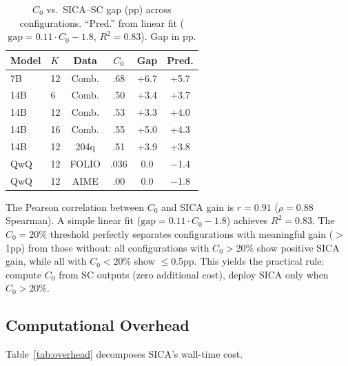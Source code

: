 \documentclass[11pt,a4paper]{article}
\begin{document}
\begin{table}[t]
\centering
\small
\begin{tabular}{llcccc}
\toprule
\textbf{Model} & $K$ & \textbf{Data} & $C_0$ & \textbf{Gap} & \textbf{Pred.} \\
\midrule
7B & 12 & Comb. & .68 & +6.7 & +5.7 \\
14B & 6 & Comb. & .50 & +3.4 & +3.7 \\
14B & 12 & Comb. & .53 & +3.3 & +4.0 \\
14B & 16 & Comb. & .55 & +5.0 & +4.3 \\
14B & 12 & 204q & .51 & +3.9 & +3.8 \\
QwQ & 12 & FOLIO & .036 & 0.0 & $-$1.4 \\
QwQ & 12 & AIME & .00 & 0.0 & $-$1.8 \\
\bottomrule
\end{tabular}
\caption{$C_0$ vs.\ SICA--SC gap (pp) across configurations. ``Pred.'' from linear fit ($\text{gap} = 0.11 \cdot C_0 - 1.8$, $R^2\!=\!0.83$). Gap in pp.}
\label{tab:c0_predictor}
\end{table}

The Pearson correlation between $C_0$ and SICA gain is $r = 0.91$ ($\rho = 0.88$ Spearman). A simple linear fit ($\text{gap} = 0.11 \cdot C_0 - 1.8$) achieves $R^2 = 0.83$. The $C_0 = 20\%$ threshold perfectly separates configurations with meaningful gain ($>$1pp) from those without: all configurations with $C_0 > 20\%$ show positive SICA gain, while all with $C_0 < 20\%$ show $\leq$0.5pp. This yields the practical rule: compute $C_0$ from SC outputs (zero additional cost), deploy SICA only when $C_0 > 20\%$.

\subsection{Computational Overhead}
\label{sec:overhead}

Table~\ref{tab:overhead} decomposes SICA's wall-time cost.
\end{document}
